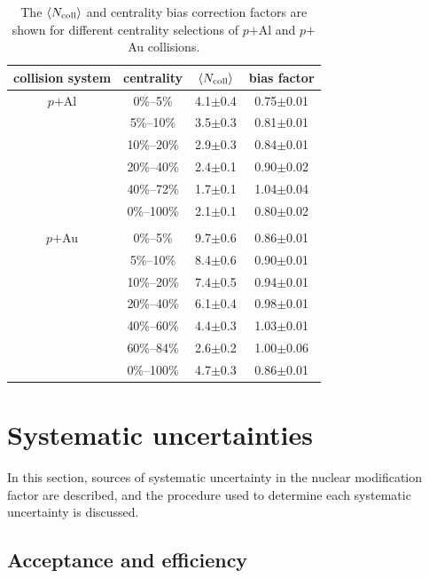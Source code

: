 \documentclass[twocolumn,letterpaper,aps,prc,longbibliography,superscriptaddress,nofootinbib,floatfix]{revtex4-2}
\newcommand{\ncoll}{\mbox{$\langle N_{\rm coll} \rangle$}\xspace}
\newcommand{\pau}{\mbox{$p$$+$Au}\xspace}
\newcommand{\pal}{\mbox{$p$$+$Al}\xspace}
\begin{document}
\begin{table}[tbh]
\caption{\label{tab:centrality}
The \ncoll and centrality bias correction factors are shown for different centrality selections of \pal and \pau collisions.
}
\begin{ruledtabular} \begin{tabular}{cccc}
 collision system & centrality & \ncoll & bias factor \\\hline
 \pal & 0\%--5\%   & 4.1$\pm$0.4  & 0.75$\pm$0.01 \\
      & 5\%--10\%  & 3.5$\pm$0.3  & 0.81$\pm$0.01 \\
      & 10\%--20\% & 2.9$\pm$0.3  & 0.84$\pm$0.01 \\
      & 20\%--40\% & 2.4$\pm$0.1  & 0.90$\pm$0.02 \\
      & 40\%--72\% & 1.7$\pm$0.1  & 1.04$\pm$0.04 \\  
      & 0\%--100\% & 2.1$\pm$0.1  & 0.80$\pm$0.02 \\
\\
 \pau & 0\%--5\%   & 9.7$\pm$0.6  & 0.86$\pm$0.01 \\
      & 5\%--10\%  & 8.4$\pm$0.6  & 0.90$\pm$0.01 \\
      & 10\%--20\% & 7.4$\pm$0.5  & 0.94$\pm$0.01 \\
      & 20\%--40\% & 6.1$\pm$0.4  & 0.98$\pm$0.01 \\
      & 40\%--60\% & 4.4$\pm$0.3  & 1.03$\pm$0.01 \\
      & 60\%--84\% & 2.6$\pm$0.2  & 1.00$\pm$0.06 \\
      & 0\%--100\% & 4.7$\pm$0.3  & 0.86$\pm$0.01 \\
\end{tabular} \end{ruledtabular}
\end{table}


\section{Systematic uncertainties}
\label{sec:sys_uncert}

In this section, sources of systematic uncertainty in the nuclear 
modification factor are described, and the procedure used to determine 
each systematic uncertainty is discussed.

\subsection{Acceptance and efficiency}
\end{document}
